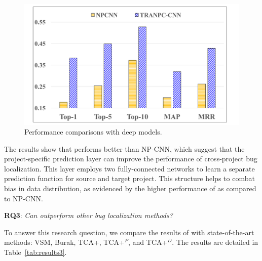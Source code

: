 \begin{figure}[hbt]
\centering
\includegraphics[width = 0.9\columnwidth]{pic/results2_avg.pdf}
\caption{Performance comparisons with deep models.}
\label{fig:results2}
\end{figure}

The results show that \TRANPCNN performs better than NP-CNN, which suggest that the project-specific prediction layer can improve the performance of cross-project bug localization. This layer employs two fully-connected networks to learn a separate prediction function for source and target project. This structure helps to combat bias in data distribution, as evidenced by the higher performance of \TRANPCNN as compared to NP-CNN.  

\textbf{RQ3}: \textit{Can \TRANPCNN outperform other bug localization methods?}

To answer this research question, we compare the results of \TRANPCNN with state-of-the-art methods: VSM, Burak, TCA+, TCA+$^P$, and TCA+$^D$. %
The results are detailed in Table~\ref{tab:results3}. 


